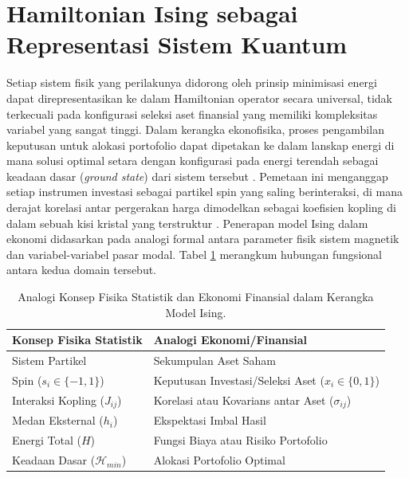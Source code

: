 \section{Hamiltonian Ising sebagai Representasi Sistem Kuantum}
\label{sec:hamiltonian_ising}
Setiap sistem fisik yang perilakunya didorong oleh prinsip minimisasi energi dapat direpresentasikan ke dalam Hamiltonian operator secara universal, tidak terkecuali pada konfigurasi seleksi aset finansial yang memiliki kompleksitas variabel yang sangat tinggi. Dalam kerangka ekonofisika, proses pengambilan keputusan untuk alokasi portofolio dapat dipetakan ke dalam lanskap energi di mana solusi optimal setara dengan konfigurasi pada energi terendah sebagai keadaan dasar (\textit{ground state}) dari sistem tersebut \cite{lucas_ising_2014}. Pemetaan ini menganggap setiap instrumen investasi sebagai partikel spin yang saling berinteraksi, di mana derajat korelasi antar pergerakan harga dimodelkan sebagai koefisien kopling di dalam sebuah kisi kristal yang terstruktur \cite{galam_ising_2010}. Penerapan model Ising dalam ekonomi didasarkan pada analogi formal antara parameter fisik sistem magnetik dan variabel-variabel pasar modal. Tabel \ref{tab:physics_econ_analogy} merangkum hubungan fungsional antara kedua domain tersebut. 

\begin{table}[htbp]
\centering
\caption{Analogi Konsep Fisika Statistik dan Ekonomi Finansial dalam Kerangka Model Ising.}
\label{tab:physics_econ_analogy}
\begin{tabular}{|l|l|}
\hline
\textbf{Konsep Fisika Statistik} & \textbf{Analogi Ekonomi/Finansial} \\ \hline
Sistem Partikel & Sekumpulan Aset Saham \\ \hline
Spin ($s_i \in \{-1, 1\}$) & Keputusan Investasi/Seleksi Aset ($x_i \in \{0, 1\}$) \\ \hline
Interaksi Kopling ($J_{ij}$) & Korelasi atau Kovarians antar Aset ($\sigma_{ij}$) \\ \hline
Medan Eksternal ($h_i$) & Ekspektasi Imbal Hasil \\ \hline
Energi Total ($H$) & Fungsi Biaya atau Risiko Portofolio \\ \hline
Keadaan Dasar ($\mathcal{H}_{min}$) & Alokasi Portofolio Optimal \\ \hline
\end{tabular}
\end{table}

